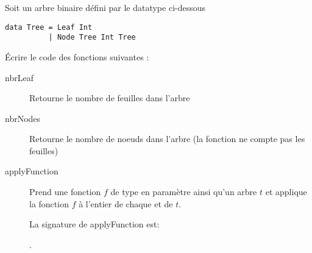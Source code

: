 \begin{Exercise}[title={Récursion et arbre binaire}]
  \label{ex:recursion_arbre_binaire}
Soit un arbre binaire défini par le datatype ci-dessous
\begin{verbatim}
data Tree = Leaf Int
          | Node Tree Int Tree
\end{verbatim}

\noindent Écrire le code des fonctions suivantes :
\begin{description}
\item[nbrLeaf] Retourne le nombre de feuilles dans l'arbre
\item[nbrNodes] Retourne le nombre de noeuds dans l'arbre (la fonction
  ne compte pas les feuilles)
\item[applyFunction] Prend une fonction $f$ de type  
  en paramètre ainsi qu'un arbre $t$ et applique la fonction
  $f$ à l'entier de chaque  et  de
  $t$.

  La signature de applyFunction est:

 .
 
\end{description}
\end{Exercise}

\begin{Answer}[ref={ex:recursion_arbre_binaire}]
\end{Answer}